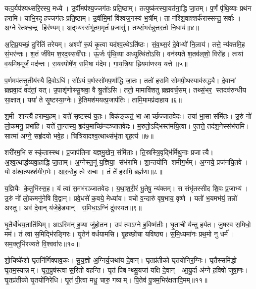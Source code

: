यत्प॒र्यप॑श्यथ्सरि॒रस्य॒ मध्ये। उ॒र्वीमप॑श्य॒ज्जग॑तः प्रति॒ष्ठाम्। तत्पुष्क॑रस्या॒यत॑ना॒द्धि जा॒तम्। प॒र्णं पृ॑थि॒व्याः प्रथ॑न हरामि। याभि॒रदृह॒ज्जग॑तः प्रति॒ष्ठाम्। उ॒र्वीमि॒मां वि॑श्वज॒नस्य॑ भ॒र्त्रीम्। ता न॑श्शि॒वाश्शर्क॑रास्सन्तु॒ सर्वाः। अ॒ग्ने रेत॑श्च॒न्द्र हिर॑ण्यम्। अ॒द्भ्यस्संभू॑तम॒मृतं॑ प्र॒जासु॑। तथ्सं॒भर॑न्नुत्तर॒तो नि॒धाय॑॥४॥

अ॒ति॒प्र॒यच्छं॒ दुरि॑तिं तरेयम्। अश्वो॑ रू॒पं कृ॒त्वा यद॑श्व॒त्थेऽति॑ष्ठः। सं॒व॒थ्स॒रं दे॒वेभ्यो॑ नि॒लाय॑। तत्ते॒ न्य॑क्तमि॒ह सं॒भर॑न्तः। श॒तं जी॑वेम श॒रद॒स्सवी॑राः। ऊ॒र्जः पृ॑थि॒व्या अध्युत्थि॑तोऽसि। वन॑स्पते श॒तव॑ल्‌शो॒ विरो॑ह। त्वया॑ व॒यमिष॒मूर्जं॒ मद॑न्तः। रा॒यस्पोषे॑ण॒ समि॒षा म॑देम। गा॒य॒त्रि॒या ह्रि॒यमा॑णस्य॒ यत्ते॥५॥

प॒र्णमप॑तत्तृ॒तीय॑स्यै दि॒वोऽधि॑। सो॑ऽयं प॒र्णस्सो॑मप॒र्णाद्धि जा॒तः। ततो॑ हरामि सोमपी॒थस्याव॑रुद्ध्यै। दे॒वानां ब्रह्मवा॒दं वद॑तां॒ यत्। उ॒पाशृ॑णोस्सु॒श्रवा॒ वै श्रु॒तो॑ऽसि। ततो॒ मामावि॑शतु ब्रह्मवर्च॒सम्। तथ्सं॒भर॒ स्तदव॑रुन्धीय सा॒क्षात्। यया॑ ते सृ॒ष्टस्या॒ग्नेः। हे॒तिमश॑मयत्प्र॒जाप॑तिः। तामि॒मामप्र॑दाहाय॥६॥

श॒मी शान्त्यै॑ हराम्य॒हम्। यत्ते॑ सृ॒ष्टस्य॑ य॒तः। विक॑ङ्कतं॒ भा आर्च्छज्जातवेदः। तया॑ भा॒सा संमि॑तः। उ॒रुं नो॑ लो॒कमनु॒ प्रभा॑हि। यत्ते॑ ता॒न्तस्य॒ हृद॑य॒माच्छि॑न्दञ्जातवेदः। म॒रुतो॒ऽद्भिस्त॑मयि॒त्वा। ए॒तत्ते॒ तद॑श॒नेस्संभ॑रामि। सात्मा॑ अग्ने॒ सहृ॑दयो भवे॒ह। चित्रि॑यादश्व॒त्थाथ्संभृ॑ता बृह॒त्य॑॥७॥

शरी॑रम॒भि सस्कृ॑तास्स्थ। प्र॒जाप॑तिना यज्ञमु॒खेन॒ संमि॑ताः। ति॒स्रस्त्रि॒वृद्भि॑र्मिथु॒नाः प्रजात्यै। अ॒श्व॒त्थाद्ध॑व्यवा॒हाद्धि जा॒ताम्। अ॒ग्नेस्त॒नूं य॒ज्ञिया॒ संभ॑रामि। शा॒न्तयो॑नि शमीग॒र्भम्। अ॒ग्नये॒ प्रज॑नयि॒तवे। यो अ॑श्व॒त्थश्श॑मीग॒र्भः। आ॒रु॒रोह॒ त्वे सचा। तं ते॑ हरामि॒ ब्रह्म॑णा॥८॥

य॒ज्ञियैः के॒तुभि॑स्स॒ह। यं त्वा॑ स॒मभ॑रञ्जातवेदः। य॒था॒श॒री॒रं भू॒तेषु॒ न्य॑क्तम्। स संभृ॑तस्सीद शि॒वः प्र॒जाभ्य॑। उ॒रुं नो॑ लो॒कमनु॑नेषि वि॒द्वान्। प्रवे॒धसे॑ क॒वये॒ मेध्या॑य। वचो॑ व॒न्दारु॑ वृष॒भाय॒ वृष्णे। यतो॑ भ॒यमभ॑यं॒ तन्नो॑ अस्तु। अव॑ दे॒वान् य॑जे॒हेड्यान्॑। स॒मिधा॒ऽग्निं दु॑वस्यत॥९॥

घृ॒तैर्बो॑धय॒ताति॑थिम्। आऽस्मि॑न् ह॒व्या जु॑होतन। उप॑ त्वाऽग्ने ह॒विष्म॑तीः। घृ॒ताचीर्यन्तु हर्यत। जु॒षस्व॑ स॒मिधो॒ मम॑। तं त्वा॑ स॒मिद्भि॑रङ्गिरः। घृ॒तेन॑ वर्धयामसि। बृ॒हच्छो॑चा यविष्ठ्य। स॒मि॒ध्यमा॑नः प्रथ॒मो नु धर्म॑। सम॒क्तुभि॑रज्यते वि॒श्ववा॑रः॥१०॥

शो॒चिष्के॑शो घृ॒तनि॑र्णिक्पाव॒कः। सु॒य॒ज्ञो अ॒ग्निर्य॒जथा॑य दे॒वान्। घृ॒तप्र॑तीको घृ॒तयो॑निर॒ग्निः। घृ॒तैस्समि॑द्धो घृ॒तम॒स्यान्नम्। घृ॒त॒प्रुष॑स्त्वा स॒रितो॑ वहन्ति। घृ॒तं पिबन्थ्सु॒यजा॑ यक्षि दे॒वान्। आ॒यु॒र्दा अ॑ग्ने ह॒विषो॑ जुषा॒णः। घृ॒तप्र॑तीको घृ॒तयो॑निरेधि। घृ॒तं पी॒त्वा मधु॒ चारु॒ गव्यम्। पि॒तेव॑ पु॒त्रम॒भिर॑क्षतादि॒मम्॥११॥


